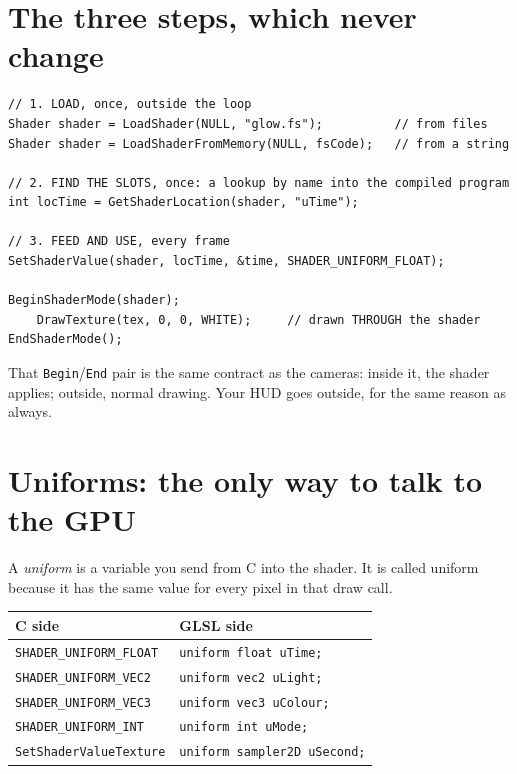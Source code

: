 
\section{The three steps, which never change}

\begin{lstlisting}
// 1. LOAD, once, outside the loop
Shader shader = LoadShader(NULL, "glow.fs");          // from files
Shader shader = LoadShaderFromMemory(NULL, fsCode);   // from a string

// 2. FIND THE SLOTS, once: a lookup by name into the compiled program
int locTime = GetShaderLocation(shader, "uTime");

// 3. FEED AND USE, every frame
SetShaderValue(shader, locTime, &time, SHADER_UNIFORM_FLOAT);

BeginShaderMode(shader);
    DrawTexture(tex, 0, 0, WHITE);     // drawn THROUGH the shader
EndShaderMode();
\end{lstlisting}

That \lstinline|Begin|/\lstinline|End| pair is the same contract as the cameras:
inside it, the shader applies; outside, normal drawing. Your HUD goes outside,
for the same reason as always.

\section{Uniforms: the only way to talk to the GPU}

A \emph{uniform} is a variable you send from C into the shader. It is called
uniform because it has the same value for every pixel in that draw call.

\begin{center}
\begin{tabular}{@{}ll@{}}
\toprule
\textbf{C side} & \textbf{GLSL side} \\
\midrule
\lstinline|SHADER_UNIFORM_FLOAT| & \lstinline|uniform float uTime;| \\
\lstinline|SHADER_UNIFORM_VEC2| & \lstinline|uniform vec2 uLight;| \\
\lstinline|SHADER_UNIFORM_VEC3| & \lstinline|uniform vec3 uColour;| \\
\lstinline|SHADER_UNIFORM_INT| & \lstinline|uniform int uMode;| \\
\lstinline|SetShaderValueTexture| & \lstinline|uniform sampler2D uSecond;| \\
\bottomrule
\end{tabular}
\end{center}

